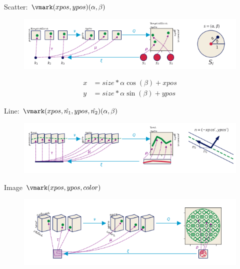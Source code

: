 \documentclass[xcolor={dvipsnames}, handout]{beamer}
\begin{document}
\begin{frame}{Scatter: $\vmark(xpos, ypos)(\alpha, \beta)$}
    \begin{figure}[H]
        \includegraphics[width=1\textwidth]{figures/math/scatter.png}
    \end{figure}
    
    \begin{align*}
        x &= size *\alpha \cos(\beta) + xpos \\
        y &= size *\alpha \sin(\beta) + ypos
    \end{align*}    
\end{frame}

\begin{frame}{Line: $\vmark(xpos, \hat{n_{1}}, ypos, \hat{n_{2}})(\alpha, \beta)$ }
    \begin{figure}[H]
        \includegraphics[width=1\textwidth]{figures/math/line.png}
    \end{figure}
\end{frame}

\begin{frame}{Image $\vmark(xpos, ypos, color)$}
    \begin{figure}[H]
        \includegraphics[width=1\textwidth]{figures/math/image.png}
    \end{figure}
\end{frame}
\end{document}
